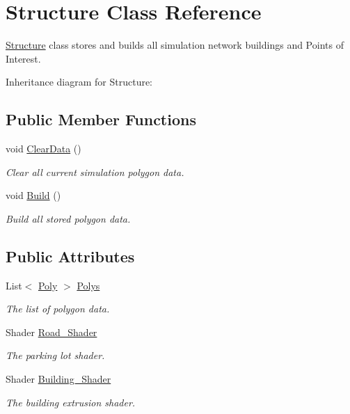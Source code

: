 \hypertarget{class_structure}{}\section{Structure Class Reference}
\label{class_structure}


\mbox{\hyperlink{class_structure}{Structure}} class stores and builds all simulation network buildings and Points of Interest.  


Inheritance diagram for Structure\+:\begin{figure}[H]
\begin{center}
\leavevmode
\end{center}
\end{figure}
\subsection*{Public Member Functions}
\begin{DoxyCompactItemize}
\item 
void \mbox{\hyperlink{class_structure_a403435d05e2eec3c6ede0d842ad67b53}{Clear\+Data}} ()
\begin{DoxyCompactList}\small\item\em Clear all current simulation polygon data. \end{DoxyCompactList}\item 
void \mbox{\hyperlink{class_structure_a8603f9a973205d3dcaf81710fa79158d}{Build}} ()
\begin{DoxyCompactList}\small\item\em Build all stored polygon data. \end{DoxyCompactList}\end{DoxyCompactItemize}
\subsection*{Public Attributes}
\begin{DoxyCompactItemize}
\item 
List$<$ \mbox{\hyperlink{struct_poly}{Poly}} $>$ \mbox{\hyperlink{class_structure_a45d7defe9341ce74797d6fd86a6ed45f}{Polys}}
\begin{DoxyCompactList}\small\item\em The list of polygon data. \end{DoxyCompactList}\item 
Shader \mbox{\hyperlink{class_structure_a782bbfbf7bbb02c511a9f90e29c3e152}{Road\+\_\+\+Shader}}
\begin{DoxyCompactList}\small\item\em The parking lot shader. \end{DoxyCompactList}\item 
Shader \mbox{\hyperlink{class_structure_aa06a0148d5f248e9a906266898dc79d4}{Building\+\_\+\+Shader}}
\begin{DoxyCompactList}\small\item\em The building extrusion shader. \end{DoxyCompactList}\end{DoxyCompactItemize}


